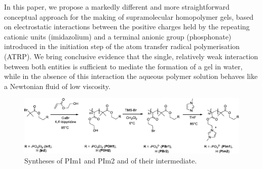 \documentclass[prl,a4paper,twocolumn,superscriptaddress,showkeys]{revtex4}
\begin{document}
In this paper, we propose a markedly different and more straightforward conceptual approach for the making of supramolecular homopolymer gels, based on electrostatic interactions between the positive charges held by the repeating cationic units (imidazolium) and a terminal anionic group (phosphonate) introduced in the initiation step of the atom transfer radical polymerisation (ATRP). We bring conclusive evidence that the single, relatively weak interaction between both entities is sufficient to mediate the formation of a gel in water, while in the absence of this interaction the aqueous polymer solution behaves like a Newtonian fluid of low viscosity.

\begin{figure}
\includegraphics[]{fig1}
\caption{Syntheses of PIm1 and PIm2 and of their intermediate.}
\label{fig:reaction}
\end{figure}
\end{document}

